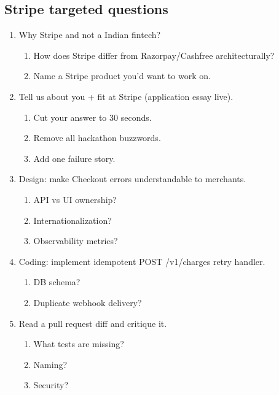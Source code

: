 \documentclass[9pt,a4paper]{article}
\begin{document}
\subsection{Stripe targeted questions}
\begin{enumerate}[label=\textbf{Q\arabic*:}, leftmargin=*]
  \item Why Stripe and not a Indian fintech?
  \begin{enumerate}[label=\textit{FU\arabic*:}, leftmargin=2em]
    \item How does Stripe differ from Razorpay/Cashfree architecturally?
    \item Name a Stripe product you'd want to work on.
  \end{enumerate}
  \item Tell us about you + fit at Stripe (application essay live).
  \begin{enumerate}[label=\textit{FU\arabic*:}, leftmargin=2em]
    \item Cut your answer to 30 seconds.
    \item Remove all hackathon buzzwords.
    \item Add one failure story.
  \end{enumerate}
  \item Design: make Checkout errors understandable to merchants.
  \begin{enumerate}[label=\textit{FU\arabic*:}, leftmargin=2em]
    \item API vs UI ownership?
    \item Internationalization?
    \item Observability metrics?
  \end{enumerate}
  \item Coding: implement idempotent POST /v1/charges retry handler.
  \begin{enumerate}[label=\textit{FU\arabic*:}, leftmargin=2em]
    \item DB schema?
    \item Duplicate webhook delivery?
  \end{enumerate}
  \item Read a pull request diff and critique it.
  \begin{enumerate}[label=\textit{FU\arabic*:}, leftmargin=2em]
    \item What tests are missing?
    \item Naming?
    \item Security?
  \end{enumerate}
\end{enumerate}
\end{document}

